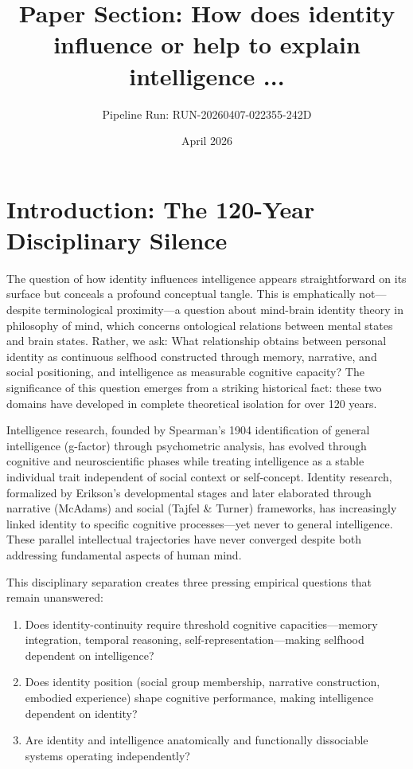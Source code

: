 \documentclass[12pt, a4paper]{article}
\title{Paper Section: How does identity influence or help to explain intelligence ...}
\author{Pipeline Run: RUN-20260407-022355-242D}
\date{April 2026}
\begin{document}
\maketitle

\section{Introduction: The 120-Year Disciplinary Silence}

The question of how identity influences intelligence appears straightforward on its surface but conceals a profound conceptual tangle. This is emphatically not—despite terminological proximity—a question about mind-brain identity theory in philosophy of mind, which concerns ontological relations between mental states and brain states. Rather, we ask: What relationship obtains between personal identity as continuous selfhood constructed through memory, narrative, and social positioning, and intelligence as measurable cognitive capacity? The significance of this question emerges from a striking historical fact: these two domains have developed in complete theoretical isolation for over 120 years.

Intelligence research, founded by Spearman's 1904 identification of general intelligence (g-factor) through psychometric analysis, has evolved through cognitive and neuroscientific phases while treating intelligence as a stable individual trait independent of social context or self-concept. Identity research, formalized by Erikson's developmental stages and later elaborated through narrative (McAdams) and social (Tajfel \& Turner) frameworks, has increasingly linked identity to specific cognitive processes—yet never to general intelligence. These parallel intellectual trajectories have never converged despite both addressing fundamental aspects of human mind.

This disciplinary separation creates three pressing empirical questions that remain unanswered:

\begin{enumerate}
\item Does identity-continuity require threshold cognitive capacities—memory integration, temporal reasoning, self-representation—making selfhood dependent on intelligence?
\item Does identity position (social group membership, narrative construction, embodied experience) shape cognitive performance, making intelligence dependent on identity?
\item Are identity and intelligence anatomically and functionally dissociable systems operating independently?
\end{enumerate}
\end{document}
